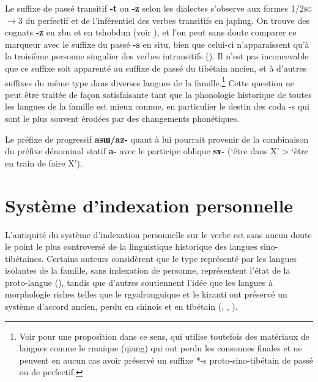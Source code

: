 \documentclass[oldfontcommands,oneside,a4paper,11pt]{article}
\newcommand{\ipa}[1]{{\phon\textbf{\mbox{#1}}}} %
\begin{document}
Le suffixe de passé transitif \ipa{-t} ou \ipa{-z} selon les dialectes s'observe aux formes \textsc{1/2sg}$\rightarrow$3 du perfectif et de l'inférentiel  des verbes transitifs en japhug. On trouve des cognats \ipa{-z} en zbu et en tshobdun (voir \citealt{jackson14morpho}), et l'on peut sans doute comparer ce marqueur avec le suffixe du passé \ipa{-s} en situ, bien que celui-ci n'apparaissent qu'à la troisième personne singulier des verbes intransitifs (\citealt{linyj03tense}). Il n'est pas inconcevable que ce suffixe soit apparenté au suffixe de passé du tibétain ancien, et à d'autres suffixes du même type dans diverses langues de la famille.\footnote{Voir \citet{huangbf97s.houzhui} pour une proposition dans ce sens, qui utilise toutefois des matériaux de langues comme le rmaïque (qiang) qui ont perdu les consonnes finales et ne peuvent en aucun cas avoir préservé un suffixe *-s proto-sino-tibétain de passé ou de perfectif.} Cette question ne peut être traitée de façon satisfaisante tant que la phonologie historique de toutes les langues de la famille est mieux connue, en particulier le destin des coda -s qui sont le plus souvent érodées par des changements phonétiques.

Le préfixe de progressif \ipa{asɯ/az-} quant à lui pourrait provenir de la combinaison du préfixe dénominal statif \ipa{a-} avec le participe oblique \ipa{sɤ-} (`être dans X' >  `être en train de faire X').

\section{Système d'indexation personnelle}

L'antiquité du système d'indexation personnelle sur le verbe est sans aucun doute le point le plus controversé de la linguistique historique des langues sino-tibétaines. Certains auteurs considèrent que le type représenté par les langues isolantes de la famille, sans indexation de personne, représentent l'état de la proto-langue (\citealt{lapolla92, lapolla03, lapolla12comments, zeisler15eat}), tandis que d'autres soutiennent l'idée que les langues à morphologie riches telles que le rgyalronguique et le kiranti ont préservé un système d'accord ancien, perdu en chinois et en tibétain (\citealt{bauman75}, \citealt{driem93agreement, delancey89agreement, delancey10agreement, delancey11prefixes, delancey14second}, \citealt{jacques10zos, jacques12agreement}).
   
\end{document}
